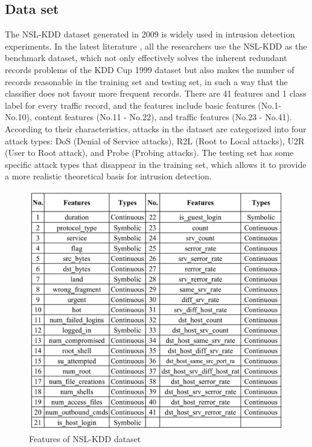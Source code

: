 \subsection{Data set}The NSL-KDD dataset generated in 2009 is widely used in intrusion detection experiments. In the latest literature , all the researchers use the NSL-KDD as the benchmark dataset, which not only effectively solves
the inherent redundant records problems of the KDD Cup 1999 dataset but also makes the number of records reasonable in the training set and testing set, in such a way that the classifier does not favour more frequent records. There are 41 features and 1 class label for every traffic record, and the features include basic features (No.1- No.10), content features (No.11 - No.22), and traffic features (No.23 - No.41). According to their characteristics, attacks in the dataset are categorized into four attack types: DoS (Denial of Service attacks), R2L (Root to Local attacks), U2R (User to Root attack), and Probe (Probing attacks). The testing set has some specific attack types that disappear in the training set, which allows it to provide a more realistic theoretical basis for intrusion detection.
\begin{figure}[h] %
\begin{center}
	\includegraphics[width=5in]{images/ftr1.jpg} 
	\caption{Features of NSL-KDD dataset} %
	\label{} %
\end{center}
\end{figure}
